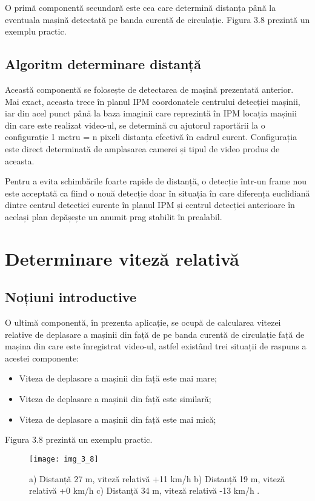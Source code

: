 O primă componentă secundară este cea care determină distanța până la eventuala mașină detectată pe banda curentă de circulație. Figura 3.8 prezintă un exemplu practic.

\subsection*{Algoritm determinare distanță}

Această componentă se folosește de detectarea de mașină prezentată anterior. Mai exact, aceasta trece în planul IPM coordonatele centrului detecției mașinii, iar din acel punct până la baza imaginii care reprezintă în IPM locația mașinii din care este realizat video-ul, se determină cu ajutorul raportării la o configurație 1 metru = n pixeli distanța efectivă în cadrul curent. Configurația este direct determinată de amplasarea camerei și tipul de video produs de aceasta. 

Pentru a evita schimbările foarte rapide de distanță, o detecție într-un frame nou este acceptată ca fiind o nouă detecție doar în situația în care diferența euclidiană dintre centrul detecției curente în planul IPM și centrul detecției anterioare în același plan depășește un anumit prag stabilit în prealabil.

\section{Determinare viteză relativă}
\subsection*{Noțiuni introductive}

O ultimă componentă, în prezenta aplicație, se ocupă de calcularea vitezei relative de deplasare a mașinii din față de pe banda curentă de circulație față de mașina din care este înregistrat video-ul, astfel existând trei situații de raspuns a acestei componente:

\begin{itemize}
	\item Viteza de deplasare a mașinii din față este mai mare;
	\item Viteza de deplasare a mașinii din față este similară;
	\item Viteza de deplasare a mașinii din față este mai mică;
\end{itemize}

Figura 3.8 prezintă un exemplu practic.
\begin{figure}[!h]
	\centering
	\texttt{[image: img\_3\_8]}
	\caption[Determinare distanță și viteză]{a) Distanță 27 m, viteză relativă +11 km/h b) Distanță 19 m, viteză relativă +0 km/h c) Distanță 34 m, viteză relativă -13 km/h .}
\end{figure}

